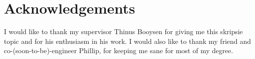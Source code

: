 \chapter*{Acknowledgements}
\makeatletter{}\makeatother


I would like to thank my supervisor Thinus Booysen for giving me this skripsie topic and for his enthusiasm in his work. I would also like to thank my friend and co-(soon-to-be)-engineer Phillip, for keeping me sane for most of my degree.